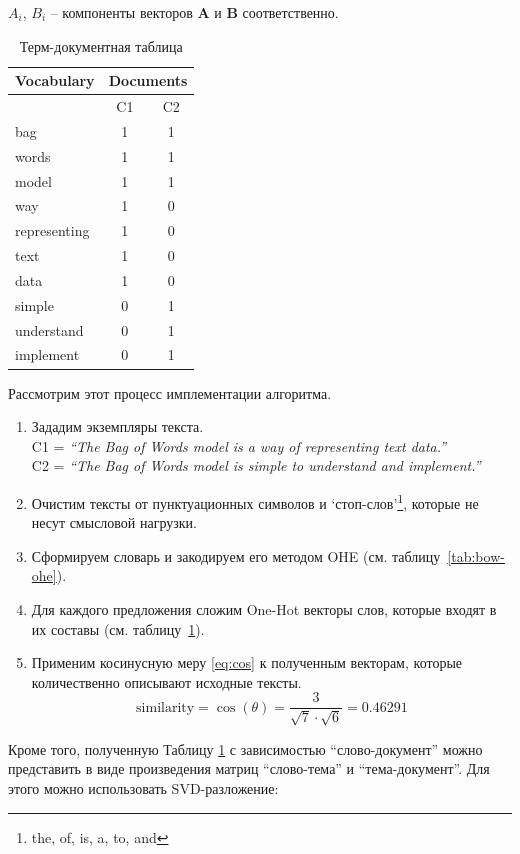 $A_{i}$, $B_{i}$ -- компоненты векторов $\mathbf {A} $ и $ \mathbf {B}$ соответственно.\\

\begin{table}
\centering
\caption{\label{tab:bow-bow}Терм-документная таблица}
\begin{tabular}{@{}lcc@{}}
\toprule
Vocabulary   & \multicolumn{2}{l}{Documents} \\ \midrule
             	    & C1            & C2            \\ \midrule
bag          	    & 1               & 1             \\
words           & 1               & 1             \\
model           & 1               & 1             \\
way              & 1               & 0             \\
representing& 1               & 0             \\
text              & 1               & 0             \\
data             & 1               & 0             \\
simple           & 0               & 1             \\
understand   & 0               & 1             \\
implement    & 0               & 1             \\ \bottomrule
\end{tabular}
\end{table}

Рассмотрим этот процесс имплементации алгоритма.
\begin{enumerate}

  \item Зададим экземпляры текста.\\C1 = \textit{“The Bag of Words model is a way of representing text data.”}\\
	C2 = \textit{“The Bag of Words model is simple to understand and implement.”}
  \item Очистим тексты от пунктуационных символов и ‘стоп-слов’\footnote{the, of, is, a, to, and}, которые не несут смысловой нагрузки. 
   \item Сформируем словарь и закодируем его методом OHE (см. таблицу~\ref{tab:bow-ohe}).

  \item Для каждого предложения сложим One-Hot векторы слов, которые входят в их составы (см. таблицу~\ref{tab:bow-bow}). 
  
  \item Применим косинусную меру \eqref{eq:cos} к полученным векторам, которые количественно описывают исходные тексты.
\begin{equation*}
{\displaystyle {\text{similarity}}=\cos(\theta )= \frac{3} { \sqrt{7} \cdot  \sqrt{6}}= {0.46291}}
\end{equation*}
\end{enumerate}
Кроме того, полученную Таблицу \ref{tab:bow-bow}  с зависимостью “слово-документ” можно представить в виде произведения матриц “слово-тема” и “тема-документ”. Для этого можно использовать SVD-разложение:

